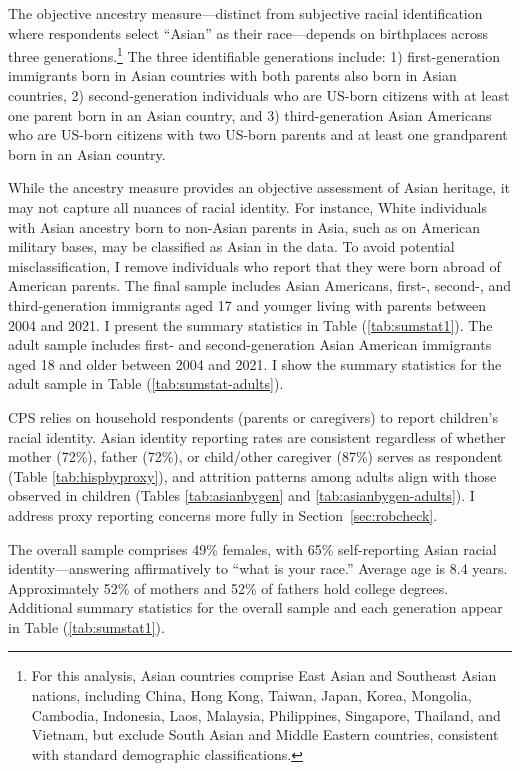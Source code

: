 \documentclass[12pt,english]{article}
\begin{document}
The objective ancestry measure---distinct from subjective racial identification where respondents select ``Asian'' as their race---depends on birthplaces across three generations.\footnote{For this analysis, Asian countries comprise East Asian and Southeast Asian nations, including China, Hong Kong, Taiwan, Japan, Korea, Mongolia, Cambodia, Indonesia, Laos, Malaysia, Philippines, Singapore, Thailand, and Vietnam, but exclude South Asian and Middle Eastern countries, consistent with standard demographic classifications.} The three identifiable generations include: 1) first-generation immigrants born in Asian countries with both parents also born in Asian countries, 2) second-generation individuals who are US-born citizens with at least one parent born in an Asian country, and 3) third-generation Asian Americans who are US-born citizens with two US-born parents and at least one grandparent born in an Asian country. 

While the ancestry measure provides an objective assessment of Asian heritage, it may not capture all nuances of racial identity. For instance, White individuals with Asian ancestry born to non-Asian parents in Asia, such as on American military bases, may be classified as Asian in the data. To avoid potential misclassification, I remove individuals who report that they were born abroad of American parents. The final sample includes Asian Americans, first-, second-, and third-generation immigrants aged 17 and younger living with parents between 2004 and 2021. I present the summary statistics in Table (\ref{tab:sumstat1}). The adult sample includes first- and second-generation Asian American immigrants aged 18 and older between 2004 and 2021. I show the summary statistics for the adult sample in Table (\ref{tab:sumstat-adults}).

CPS relies on household respondents (parents or caregivers) to report children's racial identity. Asian identity reporting rates are consistent regardless of whether mother (72\%), father (72\%), or child/other caregiver (87\%) serves as respondent (Table \ref{tab:hispbyproxy}), and attrition patterns among adults align with those observed in children (Tables \ref{tab:asianbygen} and \ref{tab:asianbygen-adults}). I address proxy reporting concerns more fully in Section~\ref{sec:robcheck}.

The overall sample comprises 49\% females, with 65\% self-reporting Asian racial identity---answering affirmatively to ``what is your race.'' Average age is 8.4 years. Approximately 52\% of mothers and 52\% of fathers hold college degrees. Additional summary statistics for the overall sample and each generation appear in Table (\ref{tab:sumstat1}).
\end{document}
